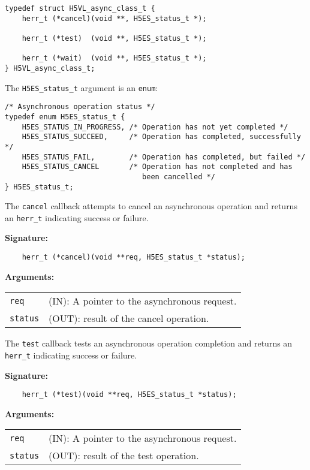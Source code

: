 \begin{lstlisting}
typedef struct H5VL_async_class_t {
    herr_t (*cancel)(void **, H5ES_status_t *);

    herr_t (*test)  (void **, H5ES_status_t *);

    herr_t (*wait)  (void **, H5ES_status_t *);
} H5VL_async_class_t;
\end{lstlisting}

The {\tt H5ES\_status\_t} argument is an {\tt enum}:
\begin{lstlisting}
/* Asynchronous operation status */
typedef enum H5ES_status_t {
    H5ES_STATUS_IN_PROGRESS, /* Operation has not yet completed */
    H5ES_STATUS_SUCCEED,     /* Operation has completed, successfully */
    H5ES_STATUS_FAIL,        /* Operation has completed, but failed */
    H5ES_STATUS_CANCEL       /* Operation has not completed and has
                                been cancelled */
} H5ES_status_t;
\end{lstlisting}

The {\tt cancel} callback attempts to cancel an asynchronous operation
and returns an {\tt herr\_t} indicating success or failure.

\textbf{Signature:}
\begin{lstlisting}
    herr_t (*cancel)(void **req, H5ES_status_t *status);
\end{lstlisting}

\textbf{Arguments:}\\
\begin{tabular}{l p{10cm}}
  {\tt req} & (IN): A pointer to the asynchronous request.\\
  {\tt status} & (OUT): result of the cancel operation.\\
\end{tabular}

The {\tt test} callback tests an asynchronous operation completion
and returns an {\tt herr\_t} indicating success or failure.

\textbf{Signature:}
\begin{lstlisting}
    herr_t (*test)(void **req, H5ES_status_t *status);
\end{lstlisting}

\textbf{Arguments:}\\
\begin{tabular}{l p{10cm}}
  {\tt req} & (IN): A pointer to the asynchronous request.\\
  {\tt status} & (OUT): result of the test operation.\\
\end{tabular}

